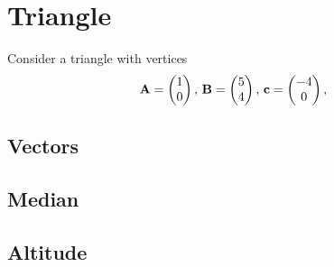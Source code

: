\documentclass[11pt]{book}
\begin{document}
\frontmatter
\tableofcontents
\setcounter{page}{0}
\mainmatter
\chapter{Triangle}
Consider a triangle with vertices
\begin{align}
\label{eq:tri-pts}
\vec{A}=\myvec{1 \\ 0},\,
\vec{B}=\myvec{5\\4},\,
	\vec{c}=\myvec{-4\\0},\,
\end{align}

\section{Vectors}
\section{Median}
\section{Altitude}
\end{document}
